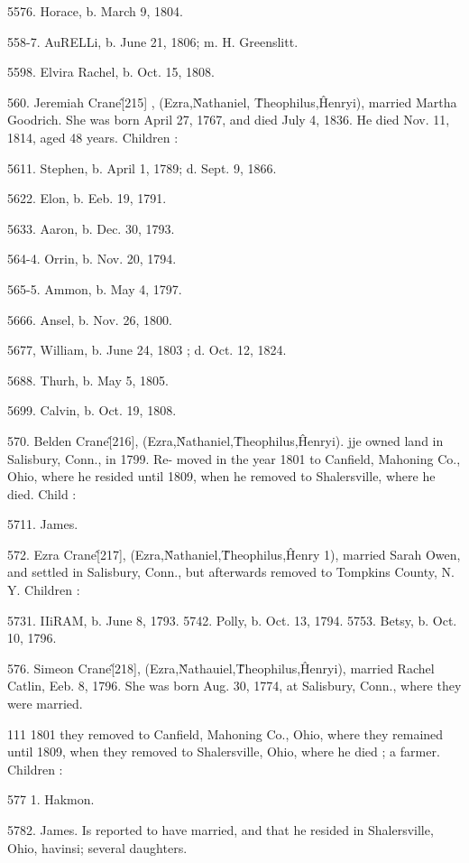 5576. Horace, b. March 9, 1804. 

558-7. AuRELLi, b. June 21, 1806; m. H. Greenslitt. 

5598. Elvira Rachel, b. Oct. 15, 1808. 

560. Jeremiah Crane\^ [215] , (Ezra,\^ Nathaniel, \^ Theophilus,\^ 
Henryi), married Martha Goodrich. She was born April 27, 
1767, and died July 4, 1836. He died Nov. 11, 1814, aged 48 
years. Children : 

5611. Stephen, b. April 1, 1789; d. Sept. 9, 1866. 

5622. Elon, b. Eeb. 19, 1791. 

5633. Aaron, b. Dec. 30, 1793.  

564-4. Orrin, b. Nov. 20, 1794. 

565-5. Ammon, b. May 4, 1797. 

5666. Ansel, b. Nov. 26, 1800. 

5677, William, b. June 24, 1803 ; d. Oct. 12, 1824. 

5688. Thurh, b. May 5, 1805. 

5699. Calvin, b. Oct. 19, 1808. 

570. Belden Crane\^ [216], (Ezra,\^ Nathaniel,\^ Theophilus,\^ 
Henryi). jje owned land in Salisbury, Conn., in 1799. Re- 
moved in the year 1801 to Canfield, Mahoning Co., Ohio, where 
he resided until 1809, when he removed to Shalersville, where he 
died. Child : 

5711. James. 

572. Ezra Crane\^ [217], (Ezra,\^ Nathaniel,\^ Theophilus,\^ 
Henry 1), married Sarah Owen, and settled in Salisbury, Conn., 
but afterwards removed to Tompkins County, N. Y. Children : 

5731. IIiRAM, b. June 8, 1793. 
5742. Polly, b. Oct. 13, 1794. 
5753. Betsy, b. Oct. 10, 1796. 

576. Simeon Crane\^ [218], (Ezra,\^ Nathauiel,\^ Theophilus,\^ 
Henryi), married Rachel Catlin, Eeb. 8, 1796. She was born 
Aug. 30, 1774, at Salisbury, Conn., where they were married. 




111 1801 they removed to Canfield, Mahoning Co., Ohio, where 
they remained until 1809, when they removed to Shalersville, 
Ohio, where he died ; a farmer. Children : 

577  1. Hakmon. 

5782. James. Is reported to have married, and that he resided in 
Shalersville, Ohio, havinsi; several daughters. 

